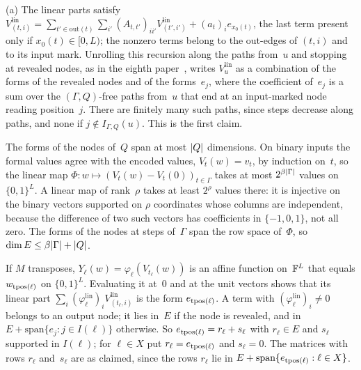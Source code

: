 \begin{outline}
(a) The linear parts satisfy
$V^{\mathrm{lin}}_{(t,i)}=\sum_{t'\in\mathrm{out}(t)}\sum_{i'}(A_{t,t'})_{ii'}V^{\mathrm{lin}}_{(t',i')}+(a_t)_ie_{x_0(t)}$,
the last term present only if $x_0(t)\in[0,L)$; the nonzero terms belong to the out-edges of $(t,i)$ and to its input
mark. Unrolling this recursion along the paths from~$u$ and stopping at revealed nodes, as in the eighth
paper~\cite[Section~7.1]{BoundedNesting2026}, writes $V^{\mathrm{lin}}_u$ as a combination of the forms of the revealed
nodes and of the forms~$e_j$, where the coefficient of~$e_j$ is a sum over the $(\Gamma,Q)$-free paths from~$u$ that end
at an input-marked node reading position~$j$. There are finitely many such paths, since steps decrease along paths, and
none if $j\notin I_{\Gamma,Q}(u)$. This is the first claim.

The forms of the nodes of~$Q$ span at most $\lvert Q \rvert$ dimensions. On binary inputs the formal values agree with the
encoded values, $V_t(w)=v_t$, by induction on~$t$, so the linear map $\Phi\colon w\mapsto(V_t(w)-V_t(0))_{t\in\Gamma}$
takes at most $2^{\beta\lvert \Gamma \rvert}$ values on $\{0,1\}^L$. A linear map of rank~$\rho$ takes at least $2^\rho$ values
there: it is injective on the binary vectors supported on $\rho$ coordinates whose columns are independent, because the
difference of two such vectors has coefficients in $\{-1,0,1\}$, not all zero. The forms of the nodes at steps
of~$\Gamma$ span the row space of~$\Phi$, so $\dim E\le\beta\lvert \Gamma \rvert+\lvert Q \rvert$.

If $M$ transposes, $Y_\ell(w)=\varphi_\ell(V_{t_\ell}(w))$ is an affine function on~$\mathbb{F}^L$ that equals $w_{\operatorname{tpos}(\ell)}$
on $\{0,1\}^L$. Evaluating it at~$0$ and at the unit vectors shows that its linear part
$\sum_i(\varphi^{\mathrm{lin}}_\ell)_iV^{\mathrm{lin}}_{(t_\ell,i)}$ is the form $e_{\operatorname{tpos}(\ell)}$. A term with
$(\varphi^{\mathrm{lin}}_\ell)_i\ne0$ belongs to an output node; it lies in~$E$ if the node is revealed, and in
$E+\mathrm{span}\{e_j:j\in I(\ell)\}$ otherwise. So $e_{\operatorname{tpos}(\ell)}=r_\ell+s_\ell$ with $r_\ell\in E$ and $s_\ell$
supported in $I(\ell)$; for $\ell\in X$ put $r_\ell=e_{\operatorname{tpos}(\ell)}$ and $s_\ell=0$. The matrices with rows $r_\ell$
and~$s_\ell$ are as claimed, since the rows $r_\ell$ lie in $E+\mathrm{span}\{e_{\operatorname{tpos}(\ell)}:\ell\in X\}$.


\end{outline}
